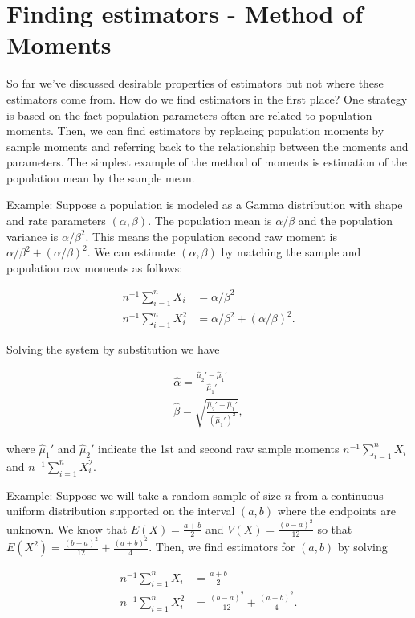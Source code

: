 \documentclass[]{book}
\begin{document}
\section{Finding estimators - Method of
Moments}\label{finding-estimators---method-of-moments}

So far we've discussed desirable properties of estimators but not where
these estimators come from. How do we find estimators in the first
place? One strategy is based on the fact population parameters often are
related to population moments. Then, we can find estimators by replacing
population moments by sample moments and referring back to the
relationship between the moments and parameters. The simplest example of
the method of moments is estimation of the population mean by the sample
mean.

Example: Suppose a population is modeled as a Gamma distribution with
shape and rate parameters \((\alpha, \beta)\). The population mean is
\(\alpha / \beta\) and the population variance is \(\alpha / \beta^2\).
This means the population second raw moment is
\(\alpha / \beta^2 + (\alpha / \beta)^2\). We can estimate
\((\alpha, \beta)\) by matching the sample and population raw moments as
follows:

\begin{align*}
n^{-1}\sum_{i=1}^n X_i &= \alpha/\beta^2\\
n^{-1}\sum_{i=1}^n X_i^2 &= \alpha/\beta^2 + (\alpha / \beta)^2.
\end{align*}

Solving the system by substitution we have

\begin{align*}
\hat\alpha = \frac{\hat\mu_2' - \hat\mu_1'}{\hat\mu_1'}\\
\hat \beta = \sqrt{\frac{\hat\mu_2' - \hat\mu_1'}{(\hat\mu_1')^2}},
\end{align*}

where \(\hat\mu_1'\) and \(\hat\mu_2'\) indicate the 1st and second raw
sample moments \(n^{-1}\sum_{i=1}^n X_i\) and
\(n^{-1}\sum_{i=1}^n X_i^2\).

Example: Suppose we will take a random sample of size \(n\) from a
continuous uniform distribution supported on the interval \((a,b)\)
where the endpoints are unknown. We know that \(E(X) = \frac{a+b}{2}\)
and \(V(X) = \frac{(b-a)^2}{12}\) so that
\(E(X^2) = \frac{(b-a)^2}{12} + \frac{(a+b)^2}{4}\). Then, we find
estimators for \((a,b)\) by solving

\begin{align*}
n^{-1}\sum_{i=1}^n X_i &= \frac{a+b}{2}\\
n^{-1}\sum_{i=1}^n X_i^2 &= \frac{(b-a)^2}{12} + \frac{(a+b)^2}{4}.
\end{align*}
\end{document}
